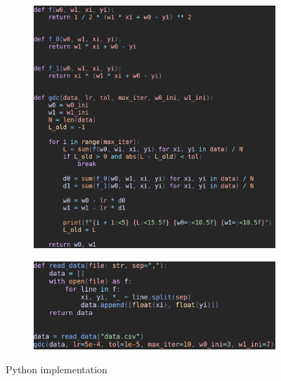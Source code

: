 \documentclass{article}
\begin{document}
\begin{figure}[H]
    \centering
    \begin{subfigure}{0.5\linewidth}
        \includegraphics[width=\linewidth]{impl1.png}
    \end{subfigure}
    \begin{subfigure}{0.5\linewidth}
        \includegraphics[width=\linewidth]{impl2.png}
    \end{subfigure}
    \caption{Python implementation}
    \label{fig:impl}
\end{figure}
\end{document}
